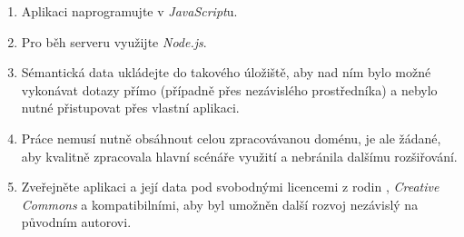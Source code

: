 \begin{enumerate}
 \item Aplikaci naprogramujte v \emph{JavaScript}u.
 \item Pro běh serveru využijte \emph{Node.js}.
 \item Sémantická data ukládejte do takového úložiště, aby nad ním bylo možné vykonávat dotazy přímo (případně přes nezávislého prostředníka) a nebylo nutné přistupovat přes vlastní aplikaci.
 \item Práce nemusí nutně obsáhnout celou zpracovávanou doménu, je ale žádané, aby kvalitně zpracovala hlavní scénáře využití a nebránila dalšímu rozšiřování.
 \item Zveřejněte aplikaci a její data pod svobodnými licencemi z rodin \emph{}, \emph{Creative Commons} a kompatibilními, aby byl umožněn další rozvoj nezávislý na původním autorovi.
\end{enumerate}




